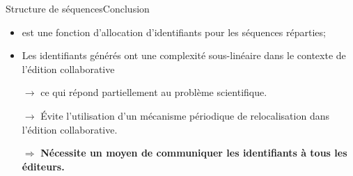 \begin{frame}{Structure de séquences}{Conclusion}

  \begin{itemize}
  \item \LSEQ est une fonction d'allocation d'identifiants pour les séquences
    réparties;
  \item Les identifiants générés ont une complexité sous-linéaire dans le contexte
    de l'édition collaborative
  \item [$\rightarrow$] ce qui répond partiellement au problème scientifique.
  \item [$\rightarrow$] Évite l'utilisation d'un mécanisme périodique de
    relocalisation dans l'édition collaborative.
  \end{itemize}


  \vspace{1cm}
  
  \large
  \begin{itemize}
  \item [$\Rightarrow$] \textbf{Nécessite un moyen de communiquer les
      identifiants à tous les éditeurs.}
  \end{itemize}

\end{frame}



